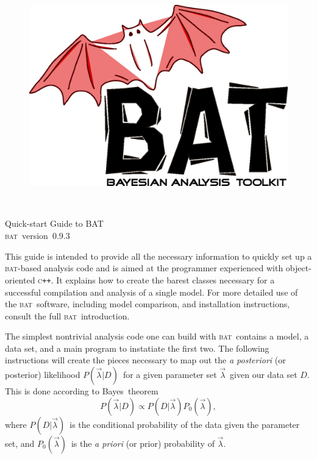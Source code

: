 \documentclass[a4paper,11pt]{article}
\newcommand{\acronym}[1]{\textsc{#1}}
\newcommand{\BAT}{\acronym{bat}}
\newcommand{\C}{\textsc{c}}
\newcommand{\CPP}{\C\texttt{++}}
\newcommand{\BProb}[2]{\ensuremath{P(#1|#2)}}
\newcommand{\BPars}{\ensuremath{\vec{\lambda}}}
\newcommand{\BData}{\ensuremath{D}}
\newcommand{\BPrior}{\ensuremath{P_0(\BPars)}}
\newcommand{\BPosterior}{\BProb{\BPars}{\BData}}
\newcommand{\BConditional}{\BProb{\BData}{\BPars}}
\newcommand{\versionno}{0.9.3}
\newcommand{\version}{version~\versionno}
\begin{document}

\begin{figure}[t]
\includegraphics[scale=0.25]{bat.eps}
\end{figure}
\quad\\
\vspace{2\baselineskip}

\begin{center}
  {\Large Quick-start Guide to BAT}\\
  \vspace{1\baselineskip}
  {\large \BAT\ \version}
\end{center}

\vspace{4\baselineskip}

This guide is intended to provide all the necessary information to
quickly set up a \BAT-based analysis code and is aimed at the
programmer experienced with object-oriented \CPP. It explains how to
create the barest classes necessary for a successful compilation and
analysis of a single model. For more detailed use of the \BAT\
software, including model comparison, and installation instructions,
consult the full \BAT\ introduction.

The simplest nontrivial analysis code one can build with \BAT\
contains a model, a data set, and a main program to instatiate the
first two. The following instructions will create the pieces necessary
to map out the \emph{a posteriori} (or posterior) likelihood
\BPosterior\ for a given parameter set \BPars\ given our data set
\BData.  This is done according to Bayes\ theorem
\begin{displaymath}
  \BPosterior \propto \BConditional\BPrior,
\end{displaymath}
where \BConditional\ is the conditional probability of the data given
the parameter set, and \BPrior\ is the \emph{a priori} (or prior)
probability of \BPars.
\end{document}
